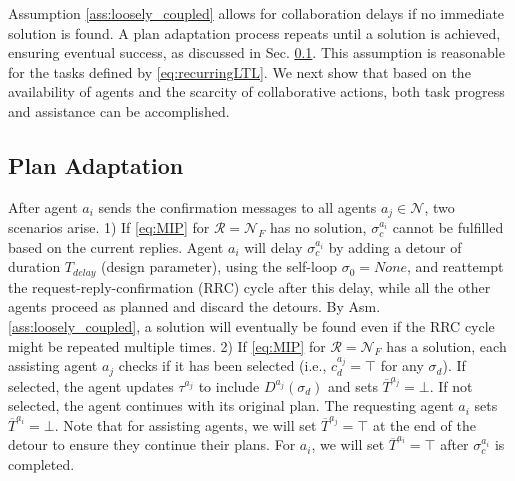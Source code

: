 Assumption \ref{ass:loosely_coupled} allows for collaboration delays if no immediate solution is found. A plan adaptation process repeats until a solution is achieved, ensuring eventual success, as discussed in Sec. \ref{sub:res-plan-adaptation}. This assumption is reasonable for the tasks defined by \eqref{eq:recurringLTL}. We next show that based on the availability of agents and the scarcity of collaborative actions, both task progress and assistance can be accomplished. %

\subsection{Plan Adaptation}\label{sub:res-plan-adaptation}

After agent $a_i$ sends the confirmation messages to all agents $a_j \in \mathcal{N}$, two scenarios arise.
1) If \eqref{eq:MIP} for $\mathcal{R}=\mathcal{N}_F$ has no solution, $\sigma^{a_i}_c$ cannot be fulfilled based on the current replies. Agent $a_i$ will delay $\sigma^{a_i}_c$ by adding a detour of duration $T_{delay}$ (design parameter), using the self-loop $\sigma_0 = \mathit{None}$, and reattempt the request-reply-confirmation (RRC) cycle after this delay, while all the other agents proceed as planned and discard the detours. By Asm. \ref{ass:loosely_coupled}, a solution will eventually be found even if the RRC cycle might be repeated multiple times.
2) If \eqref{eq:MIP} for $\mathcal{R}=\mathcal{N}_F$ has a solution, each assisting agent $a_j$ checks if it has been selected (i.e., $c^{a_j}_d = \top$ for any $\sigma_d$). If selected, the agent updates $\tau^{a_j}$ to include $D^{a_j}(\sigma_d)$ and sets $\overline{T}^{a_j} = \bot$. If not selected, the agent continues with its original plan. The requesting agent $a_i$ sets $\overline{T}^{a_i} = \bot$.
Note that for assisting agents, we will set $\overline{T}^{a_j} = \top$ at the end of the detour to ensure they continue their plans. For $a_i$, we will set $\overline{T}^{a_i} =\top$ after $\sigma^{a_i}_c$ is completed.
